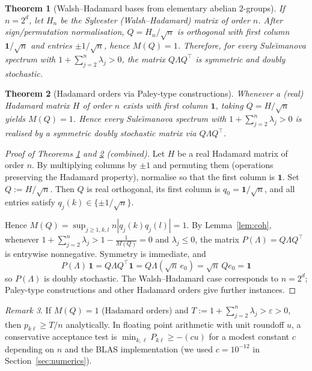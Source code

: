\documentclass[12pt,fleqn]{amsart}
\renewcommand{\le}{\leqslant}
\renewcommand{\ge}{\geqslant}
\newtheorem{thm}{Theorem}
\theoremstyle{definition}
\theoremstyle{remark}
\newtheorem{rem}[thm]{Remark}
\newcommand{\1}{\mathbf{1}}
\newcommand{\Lam}{\Lambda}
\begin{document}
\begin{thm}[Walsh--Hadamard bases from elementary abelian $2$-groups]\label{thm:hypercube}
If $n=2^d$, let $H_n$ be the Sylvester (Walsh--Hadamard) matrix of order $n$. After sign/permutation normalisation, $Q=H_n/\sqrt n$ is orthogonal with first column $\1/\sqrt n$ and entries $\pm 1/\sqrt n$, hence $M(Q)=1$. Therefore, for \emph{every} Sule\u{\i}manova spectrum with $1+\sum_{j=2}^n\lambda_j>0$, the matrix $Q\Lam Q^\top$ is symmetric and doubly stochastic.
\end{thm}

\begin{thm}[Hadamard orders via Paley-type constructions]\label{thm:hadamard}
Whenever a (real) Hadamard matrix $H$ of order $n$ exists with first column $\1$, taking $Q=H/\sqrt n$ yields $M(Q)=1$. Hence every Sule\u{\i}manova spectrum with $1+\sum_{j=2}^n\lambda_j>0$ is realised by a symmetric doubly stochastic matrix via $Q\Lam Q^\top$.
\end{thm}

\begin{proof}[Proof of Theorems \ref{thm:hypercube} and \ref{thm:hadamard} (combined)]
Let $H$ be a real Hadamard matrix of order $n$. By multiplying columns by $\pm1$ and permuting them (operations preserving the Hadamard property), normalise so that the first column is $\1$. Set $Q:=H/\sqrt n$. Then $Q$ is real orthogonal, its first column is $q_0=\1/\sqrt n$, and all entries satisfy $q_j(k)\in\{\pm 1/\sqrt n\}$.

Hence $M(Q)=\sup_{j\ge1,k,l}n|q_j(k)q_j(l)|=1$. By Lemma~\ref{lem:coh}, whenever $1+\sum_{j=2}^n\lambda_j>1-\tfrac1{M(Q)}=0$ and $\lambda_j\le 0$, the matrix $P(\Lambda)=Q\Lambda Q^\top$ is entrywise nonnegative. Symmetry is immediate, and
\[
P(\Lambda)\,\1=Q\Lambda Q^\top\1=Q\Lambda(\sqrt n\,e_0)=\sqrt n\,Qe_0=\1
\]
so $P(\Lambda)$ is doubly stochastic. The Walsh--Hadamard case corresponds to $n=2^d$; Paley-type constructions and other Hadamard orders give further instances.
\end{proof}

\begin{rem}If $M(Q)=1$ (Hadamard orders) and $T:=1+\sum_{j=2}^n\lambda_j>\varepsilon>0$, then
$p_{k\ell}\ge T/n$ analytically. In floating point arithmetic with unit roundoff $u$,
a conservative acceptance test is $\min_{k,\ell}P_{k\ell}\ge -(cu)$ for a modest constant $c$
depending on $n$ and the BLAS implementation (we used $c=10^{-12}$ in Section~\ref{sec:numerics}).
\end{rem}
\end{document}
